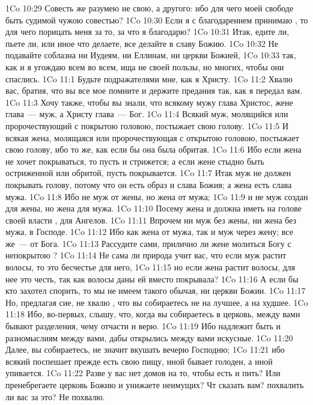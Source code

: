 \vs 1Co 10:29 Совесть же разумею не свою, а другого: ибо для чего моей свободе быть судимой чужою совестью?
\vs 1Co 10:30 Если я с благодарением принимаю , то для чего порицать меня за то, за что я благодарю?
\vs 1Co 10:31 Итак, едите ли, пьете ли, или иное что делаете, все делайте в славу Божию.
\vs 1Co 10:32 Не подавайте соблазна ни Иудеям, ни Еллинам, ни церкви Божией,
\vs 1Co 10:33 так, как и я угождаю всем во всем, ища не своей пользы, но  многих, чтобы они спаслись.
\vs 1Co 11:1 Будьте подражателями мне, как я Христу.
\rsbpar\vs 1Co 11:2 Хвалю вас, братия, что вы все мое помните и держите предания так, как я передал вам.
\vs 1Co 11:3 Хочу также, чтобы вы знали, что всякому мужу глава Христос, жене глава~--- муж, а Христу глава~--- Бог.
\vs 1Co 11:4 Всякий муж, молящийся или пророчествующий с покрытою головою, постыжает свою голову.
\vs 1Co 11:5 И всякая жена, молящаяся или пророчествующая с открытою головою, постыжает свою голову, ибо  то же, как если бы она была обритая.
\vs 1Co 11:6 Ибо если жена не хочет покрываться, то пусть и стрижется; а если жене стыдно быть остриженной или обритой, пусть покрывается.
\vs 1Co 11:7 Итак муж не должен покрывать голову, потому что он есть образ и слава Божия; а жена есть слава мужа.
\vs 1Co 11:8 Ибо не муж от жены, но жена от мужа;
\vs 1Co 11:9 и не муж создан для жены, но жена для мужа.
\vs 1Co 11:10 Посему жена и должна иметь на голове своей  власти , для Ангелов.
\vs 1Co 11:11 Впрочем ни муж без жены, ни жена без мужа, в Господе.
\vs 1Co 11:12 Ибо как жена от мужа, так и муж через жену; все же~--- от Бога.
\vs 1Co 11:13 Рассудите сами, прилично ли жене молиться Богу с непокрытою ?
\vs 1Co 11:14 Не сама ли природа учит вас, что если муж растит волосы, то это бесчестье для него,
\vs 1Co 11:15 но если жена растит волосы, для нее это честь, так как волосы даны ей вместо покрывала?
\vs 1Co 11:16 А если бы кто захотел спорить, то мы не имеем такого обычая, ни церкви Божии.
\rsbpar\vs 1Co 11:17 Но, предлагая сие, не хвалю , что вы собираетесь не на лучшее, а на худшее.
\vs 1Co 11:18 Ибо, во-первых, слышу, что, когда вы собираетесь в церковь, между вами бывают разделения, чему отчасти и верю.
\vs 1Co 11:19 Ибо надлежит быть и разномыслиям между вами, дабы открылись между вами искусные.
\vs 1Co 11:20 Далее, вы собираетесь,  не значит вкушать вечерю Господню;
\vs 1Co 11:21 ибо всякий поспешает прежде  есть свою пищу,  иной бывает голоден, а иной упивается.
\vs 1Co 11:22 Разве у вас нет домов на то, чтобы есть и пить? Или пренебрегаете церковь Божию и унижаете неимущих? Чт сказать вам? похвалить ли вас за это? Не похвалю.
